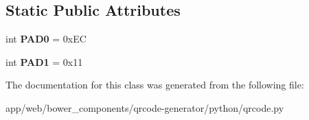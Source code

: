 \subsection*{Static Public Attributes}
\begin{DoxyCompactItemize}
\item 
\mbox{\label{classqrcode_1_1_q_r_code_a23849e82e175e3dd37fac8bd2d6f70f1}} 
int {\bfseries P\+A\+D0} = 0x\+EC
\item 
\mbox{\label{classqrcode_1_1_q_r_code_a0ba4e35f9e3ecc2d17794c663297a4e0}} 
int {\bfseries P\+A\+D1} = 0x11
\end{DoxyCompactItemize}


The documentation for this class was generated from the following file\+:\begin{DoxyCompactItemize}
\item 
app/web/bower\+\_\+components/qrcode-\/generator/python/qrcode.\+py\end{DoxyCompactItemize}
